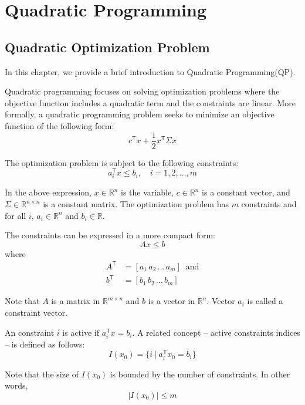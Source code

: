\documentclass[letterpaper, oneside]{book}
\theoremstyle{definition}
\theoremstyle{remark}
\begin{document}
\chapter{Quadratic Programming}

\section{Quadratic Optimization Problem}

In this chapter, we provide a brief introduction to Quadratic Programming(QP).

Quadratic programming focuses on solving optimization problems where the objective function includes a quadratic term and the constraints are linear. More formally, a quadratic programming problem seeks to minimize an objective function of the following form:
\begin{displaymath}
	c^{\mathsf{T}}x + \frac{1}{2}x^{\mathsf{T}} \Sigma x
\end{displaymath}

The optimization problem is subject to the following constraints:
\begin{displaymath}
	a_i^{\mathsf{T}}x \leqslant b_i, \quad i=1,2,...,m
\end{displaymath}

In the above expression, $x \in \mathbb{R}^n$ is the variable, $c \in \mathbb{R}^n$ is a constant vector, and $\Sigma \in \mathbb{R}^{n\times n}$ is a constant matrix. The optimization problem has $m$ constraints and for all $i$, $a_i \in \mathbb{R}^n$ and $b_i \in \mathbb{R}$.

The constraints can be expressed in a more compact form:
\begin{displaymath}
	Ax \leqslant b
\end{displaymath}
where 
\begin{align*}
	A^{\mathsf{T}} & = [a_1 \, a_2 \, ... \, a_m] \;\; \textrm{and} \\
	b^{\mathsf{T}} & = [b_1 \, b_2 \, ... \, b_m]
\end{align*}

Note that  $A$ is a matrix in $\mathbb{R}^{m \times n}$ and $b$ is a vector in $\mathbb{R}^n$. Vector $a_i$ is called a constraint vector.

An constraint $i$ is active if $a_i^{\mathsf{T}}x = b_i$. A related concept -- active constraints indices -- is defined as follows:
\[
	I(x_0) = \{i \ | \ a_i^{\mathsf{T}}x_0=b_i\}
\]

Note that the size of $I(x_0)$ is bounded by the number of constraints. In other words,
\[
	|I(x_0)| \leqslant m
\]
\end{document}
